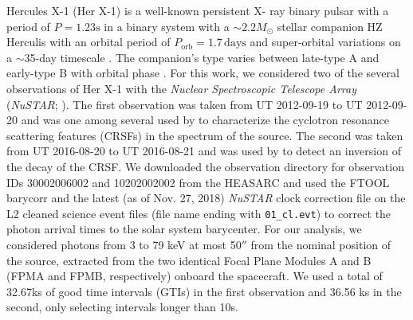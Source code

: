 \documentclass[twocolumn]{aastex62}
\newcommand{\project}[1]{\textsl{#1}\xspace}
\newcommand{\nustar}{\project{NuSTAR}\xspace}
\begin{document}
Hercules X-1 (Her X-1) is a well-known persistent X- ray binary pulsar with a period of $P = 1.23 \mathrm{s}$ \citep{tananbaum1972} in a binary system with a $\sim 2.2 M_\odot$ stellar companion HZ Herculis \citep{davidsen1972,forman1972,bahcall1972,reynolds1997,leahy2014} with an orbital period of $P_\mathrm{orb}=1.7\,\mathrm{days}$ and super-orbital variations on a $\sim$35-day timescale \citep{giacconi1973,scott1999,igna2011}. The companion's type varies between late-type A and early-type B with orbital phase \citep{anderson1994,cheng1995}. 
For this work, we considered two of the several observations of Her X-1 with the \textit{Nuclear Spectroscopic Telescope Array} (\nustar; \citealt{nustar13}). The first observation was taken from UT 2012-09-19 to UT 2012-09-20 and was one among several used by \citep{Fuerst13} to characterize the cyclotron resonance scattering features (CRSFs) in the spectrum of the source. The second was taken from UT 2016-08-20 to UT 2016-08-21 and was used by \citep{staubert_2017} to detect an inversion of the decay of the CRSF. 
We downloaded the observation directory for observation IDs 30002006002 and 10202002002 from the HEASARC and used the FTOOL barycorr and the latest (as of Nov. 27, 2018) \nustar clock correction file on the L2 cleaned science event files (file name ending with \verb|01_cl.evt|) to correct the photon arrival times to the solar system barycenter. For our analysis, we considered photons from 3 to 79 keV at most 50$''$ from the nominal position of the source, extracted from the two identical Focal Plane Modules A and B (FPMA and FPMB, respectively) onboard the spacecraft. We used a total of 32.67ks of good time intervals (GTIs) in the first observation and 36.56 ks in the second, only selecting intervals longer than 10s.



\end{document}
